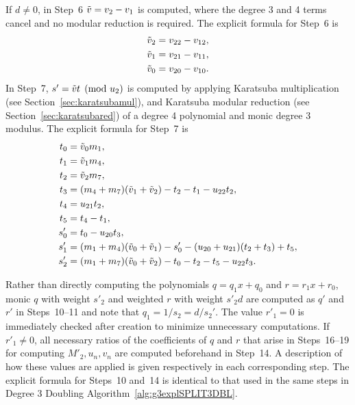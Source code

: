 If $d \neq 0$, in Step~6  $\tilde{v} = v_2 - v_1$ is computed, where the degree 3
and 4 terms cancel and no modular reduction is required. The explicit formula
for Step~6 is
\begin{align*}
    \tilde{v}_2 &= v_{22} - v_{12},\\
    \tilde{v}_1 &= v_{21} - v_{11},\\ 
    \tilde{v}_0 &= v_{20} - v_{10}.
\end{align*}
In Step~7, $s' = \tilde{v} t \pmod{u_2}$ is computed by applying Karatsuba
multiplication (see Section~\ref{sec:karatsubamul}), and Karatsuba modular
reduction (see Section~\ref{sec:karatsubared}) of a degree 4 polynomial and
monic degree 3 modulus. The explicit formula for Step~7 is
\begin{align*}
    t_0 &= \tilde{v}_0m_1,\\
    t_1 &= \tilde{v}_1m_4,\\
    t_2 &= \tilde{v}_2m_7,\\
    t_3 &= (m_4 + m_7)(\tilde{v}_1 + \tilde{v}_2) - t_2 - t_1 - u_{22}t_2,\\
    t_4 &= u_{21}t_2,\\
    t_5 &= t_4 - t_1,\\
    s_0' &= t_0 - u_{20}t_3,\\
    s_1' &= (m_1 + m_4)(\tilde{v}_0 + \tilde{v}_1) - s_0' - (u_{20} + u_{21})(t_2 + t_3) + t_5,\\
    s_2' &= (m_1 + m_7)(\tilde{v}_0 + \tilde{v}_2) - t_0 - t_2 - t_5 - u_{22}t_3.
\end{align*}

Rather than directly computing the polynomials $q = q_1x + q_0$ and $r = r_1x +
r_0$, monic $q$ with weight $s'_2$ and weighted $r$ with weight $s'_2d$ are
computed as $q'$ and $r'$ in Steps~10--11 and note that $q_1 = 1/s_2 = d/s_2'$.
The value $r'_1=0$ is immediately checked after creation to minimize unnecessary
computations. If $r'_1 \neq 0$, all necessary ratios of the coefficients of $q$
and $r$ that arise in Steps~16--19 for computing $M'_2,u_n,v_n$ are computed
beforehand in Step~14. A description of how these values are applied is given
respectively in each corresponding step. The explicit formula for Steps~10
and~14 is identical to that used in the same steps in Degree 3 Doubling
Algorithm~\ref{alg:g3explSPLIT3DBL}. 

